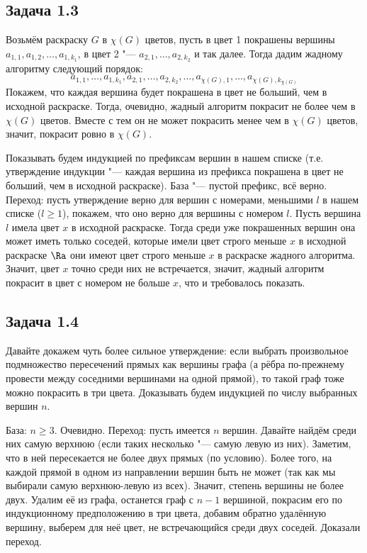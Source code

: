 \subsection{Задача 1.3}
	Возьмём раскраску $G$ в $\chi(G)$ цветов, пусть в цвет 1 покрашены вершины $a_{1,1}, a_{1,2}, \dots, a_{1,k_1}$,
	в цвет 2 "--- $a_{2,1}, \dots, a_{2,k_2}$ и так далее.
	Тогда дадим жадному алгоритму следующий порядок:
	\[
		a_{1,1}, \dots, a_{1,k_1}, a_{2,1}, \dots, a_{2,k_2}, \dots, a_{\chi(G), 1}, \dots, a_{\chi(G), k_{\chi(G)}}
	\]
	Покажем, что каждая вершина будет покрашена в цвет не больший, чем в исходной раскраске.
	Тогда, очевидно, жадный алгоритм покрасит не более чем в $\chi(G)$ цветов.
	Вместе с тем он не может покрасить менее чем в $\chi(G)$ цветов, значит, покрасит ровно в $\chi(G)$.

	Показывать будем индукцией по префиксам вершин в нашем списке
	(т.е. утверждение индукции "--- каждая вершина из префикса покрашена в цвет не больший,
	чем в исходной раскраске).
	База "--- пустой префикс, всё верно.
	Переход: пусть утверждение верно для вершин с номерами, меньшими $l$ в нашем списке ($l \ge 1$), покажем,
	что оно верно для вершины с номером $l$.
	Пусть вершина $l$ имела цвет $x$ в исходной раскраске.
	Тогда среди уже покрашенных вершин она может иметь только соседей, которые имели цвет
	строго меньше $x$ в исходной раскраске $\Ra$ они имеют цвет строго меньше $x$ в раскраске жадного алгоритма.
	Значит, цвет $x$ точно среди них не встречается, значит, жадный алгоритм покрасит в цвет с номером не больше $x$,
	что и требовалось показать.

\subsection{Задача 1.4}
	Давайте докажем чуть более сильное утверждение: если выбрать произвольное подмножество
	пересечений прямых как вершины графа (а рёбра по-прежнему провести между соседними вершинами
	на одной прямой), то такой граф тоже можно покрасить в три цвета.
	Доказывать будем индукцией по числу выбранных вершин $n$.

	База: $n \ge 3$. Очевидно.
	Переход: пусть имеется $n$ вершин.
	Давайте найдём среди них самую верхнюю (если таких несколько "--- самую левую из них).
	Заметим, что в ней пересекается не более двух прямых (по условию).
	Более того, на каждой прямой в одном из направлении вершин быть не может (так как мы выбирали
	самую верхнюю-левую из всех).
	Значит, степень вершины не более двух.
	Удалим её из графа, останется граф с $n-1$ вершиной, покрасим его по индукционному предположению в три цвета,
	добавим обратно удалённую вершину, выберем для неё цвет, не встречающийся среди двух соседей.
	Доказали переход.

